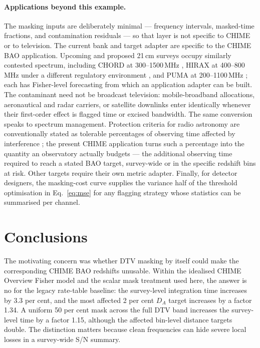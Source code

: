 \paragraph{Applications beyond this example.}
The masking inputs are deliberately minimal --- frequency intervals,
masked-time fractions, and contamination residuals --- so that layer is not
specific to CHIME or to television. The current bank and target adapter are
specific to the CHIME BAO application.
Upcoming and proposed 21\,cm surveys occupy similarly contested
spectrum, including CHORD at 300--1500\,MHz \citep{CHORD2019}, HIRAX
at 400--800\,MHz under a different regulatory environment
\citep{HIRAX2022}, and PUMA at 200--1100\,MHz \citep{PUMA2019}; each
has Fisher-level forecasting from which an application adapter can be built.
The contaminant need not be broadcast television:
mobile-broadband allocations, aeronautical and radar carriers, or
satellite downlinks enter identically whenever their first-order
effect is flagged time or excised bandwidth. The same conversion
speaks to spectrum management. Protection criteria for radio
astronomy are conventionally stated as tolerable percentages of
observing time affected by interference \citep{ITURRA769}; the
present CHIME application turns such a percentage into the quantity an
observatory actually budgets --- the additional observing time required to
reach a stated BAO target, survey-wide or in the specific redshift bins at
risk. Other targets require their own metric adapter. Finally, for detector
designers, the masking-cost curve supplies the variance half of the threshold
optimisation in Eq.~\eqref{eq:mse} for any flagging strategy whose
statistics can be summarised per channel.

\section{Conclusions}
\label{sec:conclusions}

The motivating concern was whether DTV masking by itself could make the
corresponding CHIME BAO redshifts unusable. Within the idealised CHIME
Overview Fisher model and the scalar mask treatment used here, the
answer is no for the legacy rate-table baseline: the
survey-level integration time increases by 3.3 per cent, and the most
affected 2 per cent $D_A$ target increases by a factor 1.34. A uniform
50 per cent mask across the full DTV band increases the survey-level
time by a factor 1.15, although the affected bin-level distance targets
double. The distinction matters because clean frequencies can hide
severe local losses in a survey-wide S/N summary.

